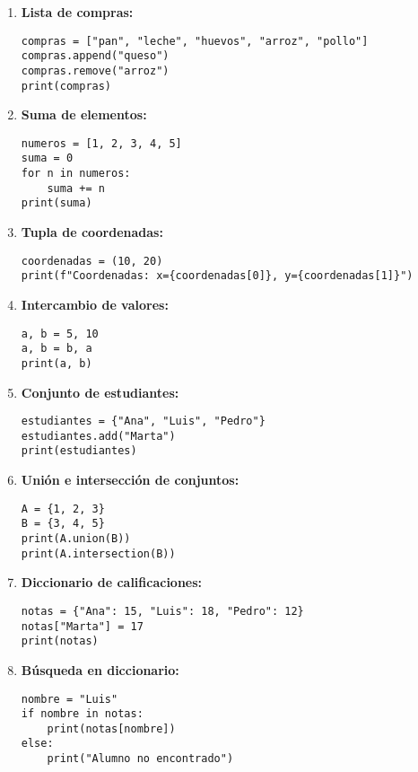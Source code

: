 \documentclass[12pt,a4paper]{article}
\begin{document}
\begin{enumerate}[label=\textbf{Ejercicio \arabic*:}, leftmargin=1.5cm]
    \item \textbf{Lista de compras:}
    \begin{lstlisting}
compras = ["pan", "leche", "huevos", "arroz", "pollo"]
compras.append("queso")
compras.remove("arroz")
print(compras)
    \end{lstlisting}

    \item \textbf{Suma de elementos:}
    \begin{lstlisting}
numeros = [1, 2, 3, 4, 5]
suma = 0
for n in numeros:
    suma += n
print(suma)
    \end{lstlisting}

    \item \textbf{Tupla de coordenadas:}
    \begin{lstlisting}
coordenadas = (10, 20)
print(f"Coordenadas: x={coordenadas[0]}, y={coordenadas[1]}")
    \end{lstlisting}

    \item \textbf{Intercambio de valores:}
    \begin{lstlisting}
a, b = 5, 10
a, b = b, a
print(a, b)
    \end{lstlisting}

    \item \textbf{Conjunto de estudiantes:}
    \begin{lstlisting}
estudiantes = {"Ana", "Luis", "Pedro"}
estudiantes.add("Marta")
print(estudiantes)
    \end{lstlisting}

    \item \textbf{Unión e intersección de conjuntos:}
    \begin{lstlisting}
A = {1, 2, 3}
B = {3, 4, 5}
print(A.union(B))
print(A.intersection(B))
    \end{lstlisting}

    \item \textbf{Diccionario de calificaciones:}
    \begin{lstlisting}
notas = {"Ana": 15, "Luis": 18, "Pedro": 12}
notas["Marta"] = 17
print(notas)
    \end{lstlisting}

    \item \textbf{Búsqueda en diccionario:}
    \begin{lstlisting}
nombre = "Luis"
if nombre in notas:
    print(notas[nombre])
else:
    print("Alumno no encontrado")
    \end{lstlisting}


\end{enumerate}
\end{document}
